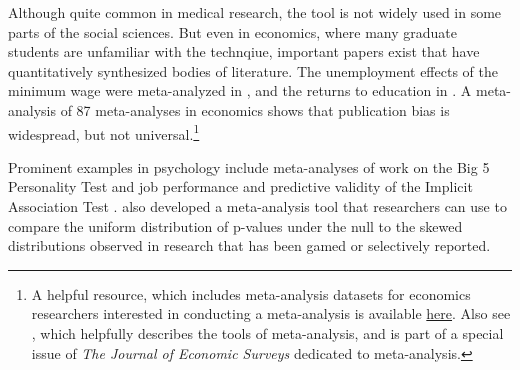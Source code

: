 \documentclass[12pt] {article}
\begin{document}
Although quite common in medical research, the tool is not widely used in some parts of the social sciences. But even in economics, where many graduate students are unfamiliar with the technqiue, important papers exist that have quantitatively synthesized bodies of literature. The unemployment effects of the minimum wage were meta-analyzed in \cite{card1995time}, and the returns to education in \cite{ashenfelter1999review}. A meta-analysis of 87 meta-analyses in economics shows that publication bias is widespread, but not universal.\footnote{A helpful resource, which includes meta-analysis datasets for economics researchers interested in conducting a meta-analysis is available \href{http://www.deakin.edu.au/business/economics/research/meta-analysis}{here}. Also see \cite{stanley2005beyond}, which helpfully describes the tools of meta-analysis, and is part of a special issue of \textit{The Journal of Economic Surveys} dedicated to meta-analysis.}

Prominent examples in psychology include meta-analyses of work on the Big 5 Personality Test and job performance \citep{barrick1991big5} and predictive validity of the Implicit Association Test \citep{greenwald2009understanding}. \cite{simonsohn_p-curve_2014} also developed a meta-analysis tool that researchers can use to compare the uniform distribution of p-values under the null to the skewed distributions observed in research that has been gamed or selectively reported.

\end{document}
